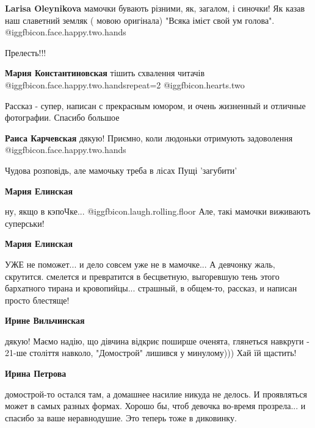 \begin{itemize}
\begin{itemize} %
\textbf{Larisa Oleynikova} мамочки бувають різними, як, загалом, і синочки! Як казав наш славетний земляк ( мовою оригінала)
"Всяка імієт свой ум голова". @igg{fbicon.face.happy.two.hands} 
\end{itemize} %

Прелесть!!!

\begin{itemize} %
\textbf{Мария Константиновская} тішить схвалення читачів @igg{fbicon.face.happy.two.hands}{repeat=2}  @igg{fbicon.hearts.two} 
\end{itemize} %


Рассказ - супер, написан с прекрасным юмором, и очень жизненный и отличные фотографии.
Спасибо большое

\begin{itemize} %
\textbf{Раиса Карчевская} дякую! Приємно, коли людоньки отримують задоволення @igg{fbicon.face.happy.two.hands} 
\end{itemize} %

Чудова розповідь, але мамочьку треба в лісах Пущі 'загубити'

\begin{itemize} %
\textbf{Мария Елинская} 

ну, якщо в кэпоЧке... @igg{fbicon.laugh.rolling.floor}  Але, такі мамочки виживають суперськи!


\textbf{Мария Елинская} 

УЖЕ не поможет... и дело совсем уже не в мамочке... А девчонку жаль, скрутится.
смелется и превратится в бесцветную, выгоревшую тень этого бархатного тирана и
кровопийцы... страшный, в общем-то, рассказ, и написан просто блестяще!

\begin{itemize} %
\textbf{Ирине Вильчинская} 

дякую! Маємо надію, що дівчина відкриє поширше оченята, глянеться навкруги -
21-ше століття навколо, "Домострой" лишився у минулому))) Хай їй щастить!

\textbf{Ирина Петрова} 

домострой-то остался там, а домашнее насилие никуда не делось. И проявляться
может в самых разных формах. Хорошо бы, чтоб девочка во-время прозрела... и
спасибо за ваше неравнодушие. Это теперь тоже в диковинку.


\end{itemize}
\end{itemize}
\end{itemize}
